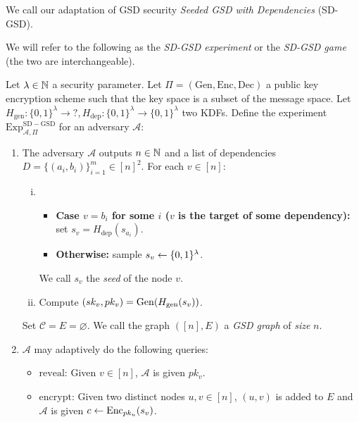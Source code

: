 We call our adaptation of GSD security \emph{Seeded GSD with Dependencies} (SD-GSD).


We will refer to the following as the \emph{SD-GSD experiment} or the \emph{SD-GSD game} (the two are interchangeable).


\begin{definition}

	Let $\lambda \in \mathbb{N}$ a security parameter.  Let $\Pi = (\mathrm{Gen}, \mathrm{Enc}, \mathrm{Dec})$ a public key encryption scheme such that the key space is a subset of the message space. Let $H_{\mathrm{gen}} \colon \{0, 1\}^\lambda \to ?, H_{\mathrm{dep}} \colon \{0, 1\}^\lambda \to \{0, 1\}^\lambda$ two KDFs. Define the experiment $\mathrm{Exp}_{\mathcal{A}, \Pi}^{\mathrm{SD-GSD}}$ for an adversary $\mathcal{A}$:
	\begin{enumerate}[1.]
		\item The adversary $\mathcal{A}$ outputs $n \in \mathbb{N}$ and a list of dependencies $D = \{(a_{i}, b_{i})\}_{i=1}^m \in [n]^2$. For each $v \in [n]$:
		      \begin{enumerate}[(i)]
			      \item \begin{itemize}
				            \item \textbf{Case $v = b_i$ for some $i$ ($v$ is the target of some dependency):} set $s_v = H_{\mathrm{dep}}(s_{a_i})$.
				            \item \textbf{Otherwise:} sample $s_v \leftarrow \{0, 1\}^\lambda$.
			            \end{itemize}
			            We call $s_v$ the \emph{seed} of the node $v$.
			      \item Compute $(sk_v, pk_v) = \mathrm{Gen}(H_\mathrm{gen}(s_v))$.
		      \end{enumerate}
		      Set $\mathcal{C} = E = \varnothing$. We call the graph $([n], E)$ a \emph{GSD graph} of \emph{size} $n$.
		\item $\mathcal{A}$ may adaptively do the following queries:
		      \begin{itemize}
			      \item $\mathrm{reveal}$: Given $v \in [n]$, $\mathcal{A}$ is given $pk_v$.
			      \item $\mathrm{encrypt}$: Given two distinct nodes $u, v \in [n]$, $(u, v)$ is added to $E$ and $\mathcal{A}$ is given $c \leftarrow \mathrm{Enc}_{pk_u}(s_v)$.

\end{itemize}
\end{enumerate}
\end{definition}

